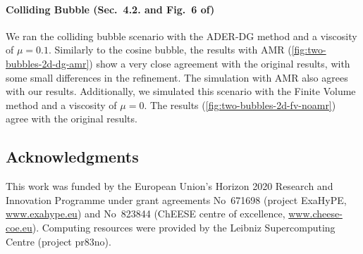 \documentclass[runningheads]{llncs}
\begin{document}
\paragraph{Colliding Bubble (Sec.~4.2. and Fig.~6 of\cite{krenz2019high})}
We ran the colliding bubble scenario with the ADER-DG method and a viscosity of $\mu=0.1$.
Similarly to the cosine bubble, the results with AMR (\cref{fig:two-bubbles-2d-dg-amr}) show a very close agreement with the original results, with some small differences in the refinement.
The simulation with AMR also agrees with our results.
Additionally, we simulated this scenario with the Finite Volume method and a viscosity of $\mu=0$.
The results (\cref{fig:two-bubbles-2d-fv-noamr}) agree with the original results.

\subsection*{Acknowledgments}
This work was funded by the European Union’s Horizon 2020 Research and Innovation Programme under grant agreements 
No~671698 (project ExaHyPE, \url{www.exahype.eu}) and 
No~823844 (ChEESE centre of excellence, \url{www.cheese-coe.eu}).
Computing resources were provided by the Leibniz Supercomputing Centre (project pr83no).


{}
\end{document}
